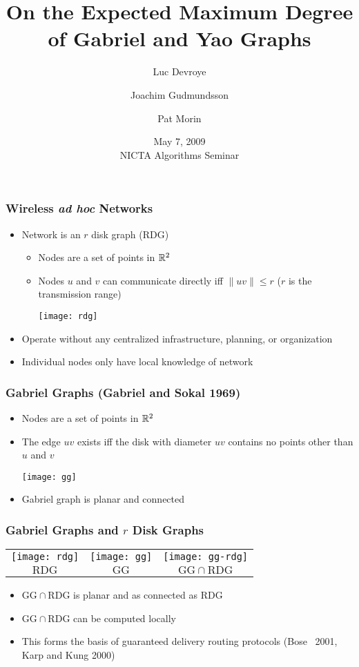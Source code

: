 \documentclass{beamer}
\title{On the Expected Maximum Degree \\ 
	of Gabriel and Yao Graphs}
\author{Luc Devroye 
	\and Joachim Gudmundsson
	\and Pat Morin}
\date{May 7, 2009 \\ NICTA Algorithms Seminar}
\newcommand{\GG}{\mathrm{GG}}
\newcommand{\RDG}{\mathrm{RDG}}
\begin{document}
\frame{\titlepage}


\frame
{
  \frametitle{Wireless \emph{ad hoc} Networks}
  \begin{itemize}
    \item Network is an $r$ disk graph ($\RDG$)
    \begin{itemize}
      \item Nodes are a set of points in $\mathbb{R}^2$
      \item Nodes $u$ and $v$ can communicate directly iff $\|uv\|\le r$  
    	($r$ is the transmission range)
      \begin{center}
	\texttt{[image: rdg]}
      \end{center}
    \end{itemize}
    \item Operate without any centralized infrastructure, 
  	planning, or organization
    \item Individual nodes only have local knowledge of network
  \end{itemize}
}

\frame
{
  \frametitle{Gabriel Graphs (Gabriel and Sokal 1969)}
  \begin{itemize}
    \item Nodes are a set of points in $\mathbb{R}^2$
    \item The edge $uv$ exists iff the disk with diameter $uv$ contains
            no points other than $u$ and $v$
    \begin{center}
      \texttt{[image: gg]}
    \end{center}
  \item Gabriel graph is planar and connected
  \end{itemize}
}

\frame
{
  \frametitle{Gabriel Graphs and $r$ Disk Graphs}
  \begin{center}
    \begin{tabular}{ccc}
      \texttt{[image: rdg]} 
           & \texttt{[image: gg]} 
           &  \texttt{[image: gg-rdg]} \\
      $\RDG$ & $\GG$ & $\GG\cap\RDG$
    \end{tabular}
  \end{center}
  \begin{itemize}
    \item $\GG\cap\RDG$ is planar and as connected as $\RDG$
    \item $\GG\cap\RDG$ can be computed locally
    \item This forms the basis of guaranteed delivery routing protocols
          (Bose \etal\ 2001, Karp and Kung 2000)
  \end{itemize}
}
\end{document}
